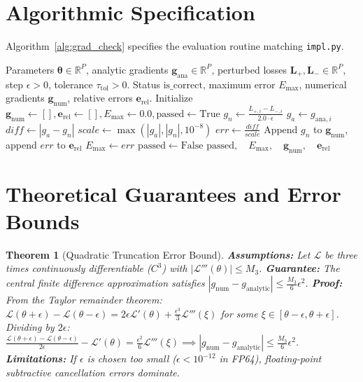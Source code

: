 \documentclass[11pt]{article}
\newtheorem{theorem}{Theorem}
\begin{document}
\section{Algorithmic Specification}
\label{sec:algorithm}

Algorithm~\ref{alg:grad_check} specifies the evaluation routine matching \texttt{impl.py}.

\begin{algorithm}[H]
\caption{Finite Difference Gradient Checking Routine}
\label{alg:grad_check}
\begin{algorithmic}[1]
\Require Parameters $\boldsymbol{\theta} \in \mathbb{R}^P$, analytic gradients $\mathbf{g}_{\mathrm{ana}} \in \mathbb{R}^P$, perturbed losses $\mathbf{L}_+, \mathbf{L}_- \in \mathbb{R}^P$, step $\epsilon > 0$, tolerance $\tau_{\mathrm{tol}} > 0$.
\Ensure Status $\mathrm{is\_correct}$, maximum error $E_{\max}$, numerical gradients $\mathbf{g}_{\mathrm{num}}$, relative errors $\mathbf{e}_{\mathrm{rel}}$.
\State Initialize $\mathbf{g}_{\mathrm{num}} \gets [], \mathbf{e}_{\mathrm{rel}} \gets [], E_{\max} \gets 0.0, \mathrm{passed} \gets \text{True}$
    \State $g_n \gets \frac{L_{+, i} - L_{-, i}}{2.0 \cdot \epsilon}$
    \State $g_a \gets g_{\mathrm{ana}, i}$
    \State $diff \gets |g_a - g_n|$
    \State $scale \gets \max(|g_a|, |g_n|, 10^{-8})$
    \State $err \gets \frac{diff}{scale}$
    \State Append $g_n$ to $\mathbf{g}_{\mathrm{num}}$, append $err$ to $\mathbf{e}_{\mathrm{rel}}$
        \State $E_{\max} \gets err$
    \EndIf
        \State $\mathrm{passed} \gets \text{False}$
    \EndIf
\EndFor
\State \Return $\mathrm{passed}, \quad E_{\max}, \quad \mathbf{g}_{\mathrm{num}}, \quad \mathbf{e}_{\mathrm{rel}}$
\end{algorithmic}
\end{algorithm}

\section{Theoretical Guarantees and Error Bounds}
\label{sec:guarantees}

\begin{theorem}[Quadratic Truncation Error Bound]
\label{thm:taylor_quadratic_error}
\textbf{Assumptions:} Let $\mathcal{L}$ be three times continuously differentiable ($C^3$) with $|\mathcal{L}'''(\theta)| \le M_3$.
\textbf{Guarantee:} The central finite difference approximation satisfies $|g_{\mathrm{num}} - g_{\mathrm{analytic}}| \le \frac{M_3}{6} \epsilon^2$.
\textbf{Proof:}
From the Taylor remainder theorem:
$\mathcal{L}(\theta + \epsilon) - \mathcal{L}(\theta - \epsilon) = 2\epsilon \mathcal{L}'(\theta) + \frac{\epsilon^3}{3} \mathcal{L}'''(\xi)$ for some $\xi \in [\theta - \epsilon, \theta + \epsilon]$.
Dividing by $2\epsilon$:
$\frac{\mathcal{L}(\theta + \epsilon) - \mathcal{L}(\theta - \epsilon)}{2\epsilon} - \mathcal{L}'(\theta) = \frac{\epsilon^2}{6} \mathcal{L}'''(\xi) \implies |g_{\mathrm{num}} - g_{\mathrm{analytic}}| \le \frac{M_3}{6} \epsilon^2$.
\textbf{Limitations:} If $\epsilon$ is chosen too small ($\epsilon < 10^{-12}$ in FP64), floating-point subtractive cancellation errors dominate.
\end{theorem}
\end{document}

